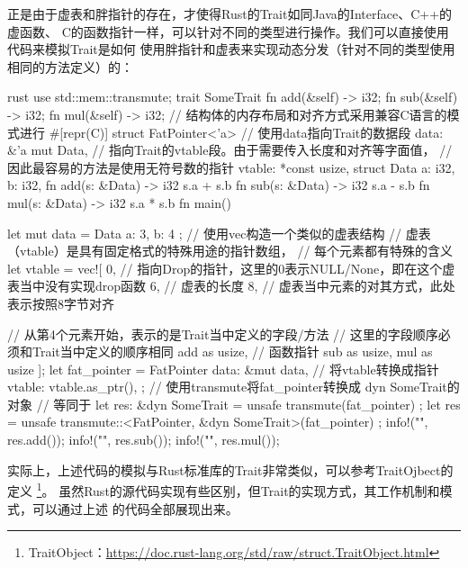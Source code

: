 正是由于虚表和胖指针的存在，才使得Rust的Trait如同Java的Interface、C++的虚函数、
C的函数指针一样，可以针对不同的类型进行操作。我们可以直接使用代码来模拟Trait是如何
使用胖指针和虚表来实现动态分发（针对不同的类型使用相同的方法定义）的：
\begin{code-block}{rust}
use std::mem::transmute;
trait SomeTrait {
    fn add(&self) -> i32;
    fn sub(&self) -> i32;
    fn mul(&self) -> i32;
}
// 结构体的内存布局和对齐方式采用兼容C语言的模式进行
#[repr(C)]
struct FatPointer<'a> {
    // 使用data指向Trait的数据段
    data: &'a mut Data,
    // 指向Trait的vtable段。由于需要传入长度和对齐等字面值，
    // 因此最容易的方法是使用无符号数的指针
    vtable: *const usize,
}
struct Data {
    a: i32,
    b: i32,
}
fn add(s: &Data) -> i32 {
    s.a + s.b
}
fn sub(s: &Data) -> i32 {
    s.a - s.b
}
fn mul(s: &Data) -> i32 {
    s.a * s.b
}
fn main() {
    let mut data = Data { a: 3, b: 4 };
    // 使用vec构造一个类似的虚表结构
    // 虚表（vtable）是具有固定格式的特殊用途的指针数组，
    // 每个元素都有特殊的含义
    let vtable = vec![
        0,  // 指向Drop的指针，这里的0表示NULL/None，即在这个虚表当中没有实现drop函数
        6,  // 虚表的长度
        8,  // 虚表当中元素的对其方式，此处表示按照8字节对齐

        // 从第4个元素开始，表示的是Trait当中定义的字段/方法
        // 这里的字段顺序必须和Trait当中定义的顺序相同
        add as usize, // 函数指针
        sub as usize,
        mul as usize
    ];
    let fat_pointer = FatPointer {
        data: &mut data,
        // 将vtable转换成指针
        vtable: vtable.as_ptr(),
    };
    // 使用transmute将fat_pointer转换成 dyn SomeTrait的对象
    // 等同于 let res: &dyn SomeTrait = unsafe { transmute(fat_pointer) };
    let res = unsafe { transmute::<FatPointer, &dyn SomeTrait>(fat_pointer) };
    info!("{}", res.add());
    info!("{}", res.sub());
    info!("{}", res.mul());
}
\end{code-block}

实际上，上述代码的模拟与Rust标准库的Trait非常类似，可以参考TraitOjbect的定义
\footnote{TraitObject：\url{https://doc.rust-lang.org/std/raw/struct.TraitObject.html}}。
虽然Rust的源代码实现有些区别，但Trait的实现方式，其工作机制和模式，可以通过上述
的代码全部展现出来。

